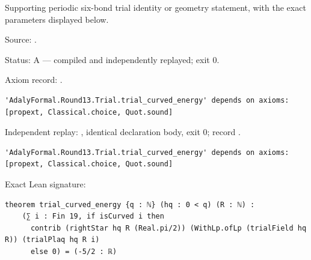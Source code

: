 \begin{theorem}[bp-427]
\label{bp-427}
\leanok
Supporting periodic six-bond trial identity or geometry statement, with the exact parameters displayed below.

\par Source: \texttt{}.
\par Status: A — compiled and independently replayed; exit 0.
\par Axiom record: \texttt{}.
\begin{verbatim}
'AdalyFormal.Round13.Trial.trial_curved_energy' depends on axioms: [propext, Classical.choice, Quot.sound]
\end{verbatim}
\par Independent replay: \texttt{}, identical declaration body, exit 0; record \texttt{}.
\begin{verbatim}
'AdalyFormal.Round13.Trial.trial_curved_energy' depends on axioms: [propext, Classical.choice, Quot.sound]
\end{verbatim}
\par Exact Lean signature:
\begin{verbatim}
theorem trial_curved_energy {q : ℕ} (hq : 0 < q) (R : ℕ) :
    (∑ i : Fin 19, if isCurved i then
      contrib (rightStar hq R (Real.pi/2)) (WithLp.ofLp (trialField hq R)) (trialPlaq hq R i)
      else 0) = (-5/2 : ℝ)
\end{verbatim}
\end{theorem}

